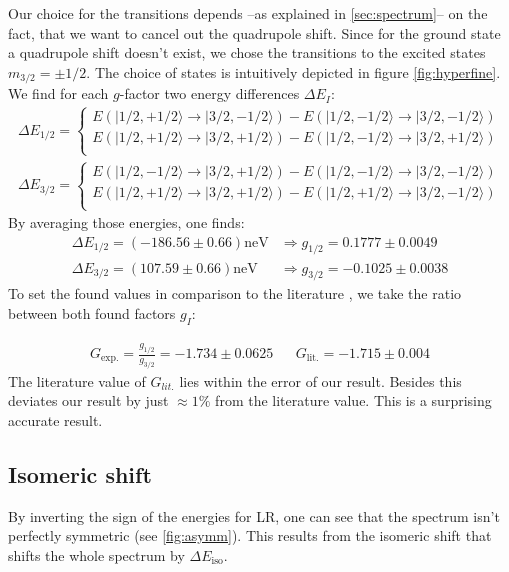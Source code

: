 \documentclass[11pt,a4paper,notitlepage]{scrartcl}
\begin{document}
Our choice for the transitions depends --as explained in \ref{sec:spectrum}-- on the fact, that we want to cancel out the quadrupole shift. Since for the ground state a quadrupole shift doesn't exist, we chose the transitions to the excited states $m_{3/2}=\pm 1/2$. The choice of states is intuitively depicted in figure \ref{fig:hyperfine}. We find for each $g$-factor  two energy differences $\Delta E_I$:
\begin{align*}
	\Delta E_{1/2}=\begin{cases}
		E(|1/2,+1/2\rangle\to|3/2,-1/2\rangle)-E(|1/2,-1/2\rangle\to|3/2,-1/2\rangle)\\
		E(|1/2,+1/2\rangle\to|3/2,+1/2\rangle)-E(|1/2,-1/2\rangle\to|3/2,+1/2\rangle)\\		
	\end{cases}	\\
	\Delta E_{3/2}=\begin{cases}
		E(|1/2,-1/2\rangle\to|3/2,+1/2\rangle)-E(|1/2,-1/2\rangle\to|3/2,-1/2\rangle)\\
		E(|1/2,+1/2\rangle\to|3/2,+1/2\rangle)-E(|1/2,+1/2\rangle\to|3/2,-1/2\rangle)\\		
	\end{cases}	
\end{align*}
By averaging those energies, one finds:
\begin{align*}
	\Delta E_{1/2}=(-186.56 \pm 0.66)\text{neV} &\Rightarrow g_{1/2}=0.1777 \pm 0.0049\\ \Delta E_{3/2}=(107.59 \pm 0.66)\text{neV}&\Rightarrow g_{3/2}=-0.1025 \pm 0.0038
\end{align*}
To set the found values in comparison to the literature \cite{gfactor}, we take the ratio between both found factors $g_I$:

\begin{align*}
	G_{\text{exp.}}=\frac{g_{1/2}}{g_{3/2}}=-1.734 \pm 0.0625 &&G_{\text{lit.}}=-1.715\pm0.004
\end{align*}
The literature value of $G_{lit.}$ lies within the error of our result. Besides this deviates our result by just $\approx1\%$ from the literature value. This is a surprising accurate result.
\newpage
\subsection{Isomeric shift}
By inverting the sign of the energies for LR, one can see that the spectrum isn't perfectly symmetric (see \ref{fig:asymm}). This results from the isomeric shift that shifts the whole spectrum by $\Delta E_{\text{iso}}$.
\end{document}
